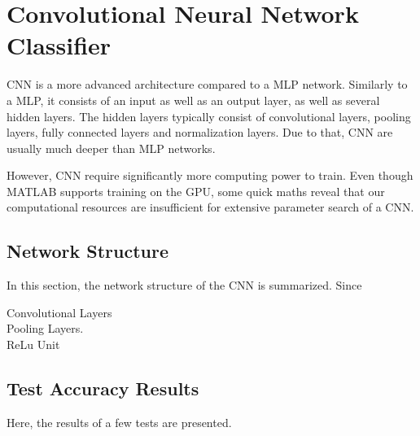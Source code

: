 \section{Convolutional Neural Network Classifier} \label{sec:CNN}
	\pagestyle{mario}

CNN is a more advanced architecture compared to a MLP network. Similarly to a MLP, it consists of an input as well as an output layer, as well as several hidden layers. The hidden layers typically consist of convolutional layers, pooling layers, fully connected layers and normalization layers. Due to that, CNN are usually much deeper than MLP networks.

However, CNN require significantly more computing power to train. Even though MATLAB supports training on the GPU, some quick maths reveal that our computational resources are insufficient for extensive parameter search of a CNN.

	
\subsection{Network Structure}

In this section, the network structure of the CNN is summarized. Since

Convolutional Layers\\

Pooling Layers.\\

ReLu Unit\\

\subsection{Test Accuracy Results}

Here, the results of a few tests are presented.



    

